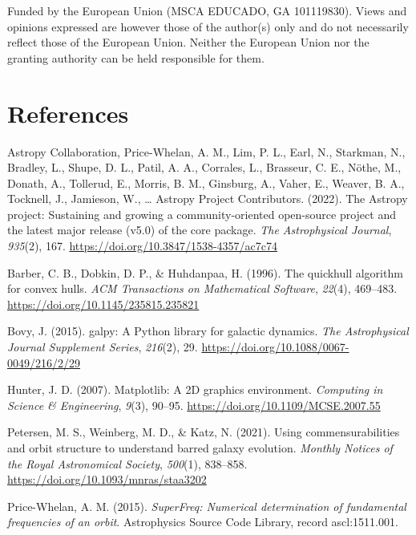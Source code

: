 \documentclass[12pt]{article}
\newlength{\cslhangindent}
\newenvironment{CSLReferences}[2] %
 {\begin{list}{}{%
  \setlength{\itemindent}{0pt}
  \setlength{\leftmargin}{0pt}
  \setlength{\parsep}{0pt}
  \ifodd #1
   \setlength{\leftmargin}{\cslhangindent}
   \setlength{\itemindent}{-1\cslhangindent}
  \fi
  \setlength{\itemsep}{#2\baselineskip}}}
 {\end{list}}
\begin{document}
Funded by the European Union (MSCA EDUCADO, GA 101119830). Views and
opinions expressed are however those of the author(s) only and do not
necessarily reflect those of the European Union. Neither the European
Union nor the granting authority can be held responsible for them.

\section*{References}\label{references}

\label{refs}
\begin{CSLReferences}{1}{0}
Astropy Collaboration, Price-Whelan, A. M., Lim, P. L., Earl, N.,
Starkman, N., Bradley, L., Shupe, D. L., Patil, A. A., Corrales, L.,
Brasseur, C. E., Nöthe, M., Donath, A., Tollerud, E., Morris, B. M.,
Ginsburg, A., Vaher, E., Weaver, B. A., Tocknell, J., Jamieson, W.,
\ldots{} Astropy Project Contributors. (2022). The {Astropy} project:
Sustaining and growing a community-oriented open-source project and the
latest major release (v5.0) of the core package. \emph{The Astrophysical
Journal}, \emph{935}(2), 167.
\url{https://doi.org/10.3847/1538-4357/ac7c74}

Barber, C. B., Dobkin, D. P., \& Huhdanpaa, H. (1996). The quickhull
algorithm for convex hulls. \emph{ACM Transactions on Mathematical
Software}, \emph{22}(4), 469--483.
\url{https://doi.org/10.1145/235815.235821}

Bovy, J. (2015). {galpy}: A {Python} library for galactic dynamics.
\emph{The Astrophysical Journal Supplement Series}, \emph{216}(2), 29.
\url{https://doi.org/10.1088/0067-0049/216/2/29}

Hunter, J. D. (2007). Matplotlib: A 2D graphics environment.
\emph{Computing in Science \& Engineering}, \emph{9}(3), 90--95.
\url{https://doi.org/10.1109/MCSE.2007.55}

Petersen, M. S., Weinberg, M. D., \& Katz, N. (2021). {Using
commensurabilities and orbit structure to understand barred galaxy
evolution}. \emph{Monthly Notices of the Royal Astronomical Society},
\emph{500}(1), 838--858. \url{https://doi.org/10.1093/mnras/staa3202}

Price-Whelan, A. M. (2015). \emph{{SuperFreq}: Numerical determination
of fundamental frequencies of an orbit}. Astrophysics Source Code
Library, record ascl:1511.001.


\end{CSLReferences}
\end{document}
